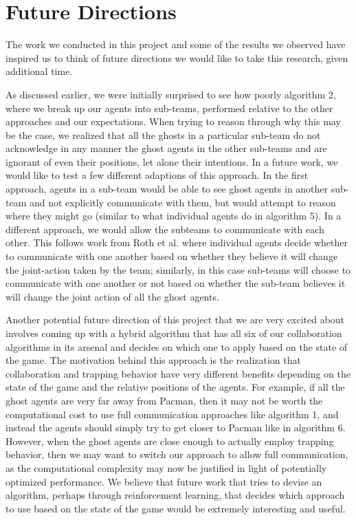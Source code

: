 \documentclass[11pt]{article}
\begin{document}
\section{Future Directions}
The work we conducted in this project and some of the results we observed have inspired us to think of future directions we would like to take this research, given additional time.

As discussed earlier, we were initially surprised to see how poorly algorithm 2, where we break up our agents into sub-teams, performed relative to the other approaches and our expectations. When trying to reason through why this may be the case, we realized that all the ghosts in a particular sub-team do not acknowledge in any manner the ghost agents in the other sub-teams and are ignorant of even their positions, let alone their intentions. In a future work, we would like to test a few different adaptions of this approach. In the first approach, agents in a sub-team would be able to see ghost agents in another sub-team and not explicitly communicate with them, but would attempt to reason where they might go (similar to what individual agents do in algorithm 5). In a different approach, we would allow the subteams to communicate with each other. This follows work from Roth et al. where individual agents decide whether to communicate with one another based on whether they believe it will change the joint-action taken by the team; similarly, in this case sub-teams will choose to communicate with one another or not based on whether the sub-team believes it will change the joint action of all the ghost agents.

Another potential future direction of this project that we are very excited about involves coming up with a hybrid algorithm that has all six of our collaboration algorithms in its arsenal and decides on which one to apply based on the state of the game. The motivation behind this approach is the realization that collaboration and trapping behavior have very different benefits depending on the state of the game and the relative positions of the agents. For example, if all the ghost agents are very far away from Pacman, then it may not be worth the computational cost to use full communication approaches like algorithm 1, and instead the agents should simply try to get closer to Pacman like in algorithm 6. However, when the ghost agents are close enough to actually employ trapping behavior, then we may want to switch our approach to allow full communication, as the computational complexity may now be justified in light of potentially optimized performance. We believe that future work that tries to devise an algorithm, perhaps through reinforcement learning, that decides which approach to use based on the state of the game would be extremely interesting and useful.
\end{document}

